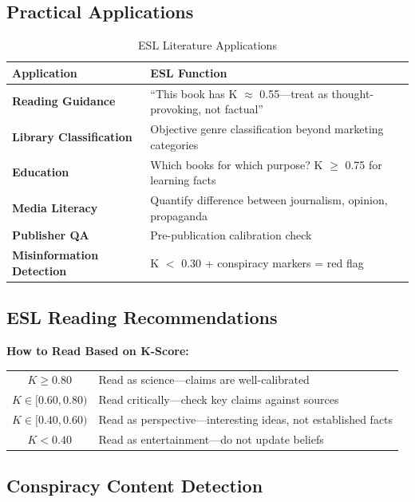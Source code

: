 \documentclass[11pt,a4paper]{article}
\begin{document}
\subsection{Practical Applications}

\begin{table}[h]
\centering
\caption{ESL Literature Applications}
\begin{tabular}{lp{8cm}}
\toprule
\textbf{Application} & \textbf{ESL Function} \\
\midrule
\textbf{Reading Guidance} & ``This book has K $\approx$ 0.55---treat as thought-provoking, not factual'' \\
\textbf{Library Classification} & Objective genre classification beyond marketing categories \\
\textbf{Education} & Which books for which purpose? K $\geq$ 0.75 for learning facts \\
\textbf{Media Literacy} & Quantify difference between journalism, opinion, propaganda \\
\textbf{Publisher QA} & Pre-publication calibration check \\
\textbf{Misinformation Detection} & K $<$ 0.30 + conspiracy markers = red flag \\
\bottomrule
\end{tabular}
\end{table}

\subsection{ESL Reading Recommendations}

\begin{resultbox}
\textbf{How to Read Based on K-Score:}

\begin{tabular}{cl}
$K \geq 0.80$ & Read as science---claims are well-calibrated \\
$K \in [0.60, 0.80)$ & Read critically---check key claims against sources \\
$K \in [0.40, 0.60)$ & Read as perspective---interesting ideas, not established facts \\
$K < 0.40$ & Read as entertainment---do not update beliefs \\
\end{tabular}
\end{resultbox}

\subsection{Conspiracy Content Detection}
\end{document}
